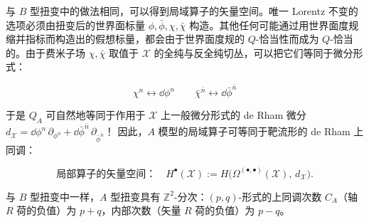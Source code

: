 

与 $B$ 型扭变中的做法相同，可以得到局域算子的矢量空间。唯一 Lorentz 不变的选项必须由扭变后的世界面标量 $\phi,\bar\phi,\chi,\bar\chi$ 构造。其他任何可能通过用世界面度规缩并指标而构造出的假想标量，都会由于世界面度规的 $Q$-恰当性而成为 $Q$-恰当的。由于费米子场 $\chi,\bar\chi$ 取值于 $\mathcal{X}$ 的全纯与反全纯切丛，可以把它们等同于微分形式：

\begin{equation}
\chi^{n}\leftrightarrow \dd\phi^{n}\qquad \bar\chi^{\bar n}\leftrightarrow \dd\bar\phi^{\bar n}
\tag{2.35}
\end{equation}

于是 $Q_A$ 可自然地等同于作用于 $\mathcal{X}$ 上一般微分形式的 de Rham 微分
$d_{\mathcal{X}} = \dd\phi^{n}\,\partial_{\phi^{n}} + \dd\bar\phi^{\bar n}\,\partial_{\bar\phi^{\bar n}}$！
因此，$A$ 模型的局域算子可等同于靶流形的 de Rham 上同调：

\begin{equation}
\text{局部算子的矢量空间：}\quad H^{\bullet}(\mathcal{X}) := H\bigl(\Omega^{(\bullet,\bullet)}(\mathcal{X}),\, d_{\mathcal{X}}\bigr).
\tag{2.36}
\end{equation}

与 $B$ 型扭变中一样，$A$ 型扭变具有 $\mathbb{Z}^2$-分次：$(p,q)$-形式的上同调次数 $C_A$（轴 $R$ 荷的负值）为 $p+q$，内部次数（矢量 $R$ 荷的负值）为 $p-q$。

